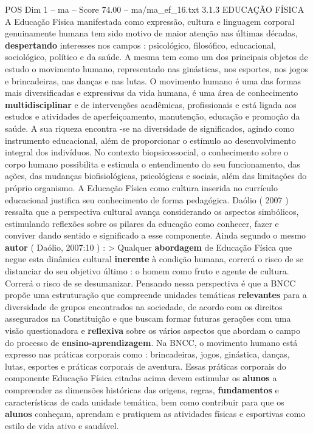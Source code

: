 \begin{textsample}{POS Dim 1 – ma – Score 74.00 – ma/ma\_ef\_16.txt}  \label{ex:f1_pos_063}
3.1.3 EDUCAÇÃO FÍSICA A Educação Física manifestada como expressão, cultura e linguagem corporal genuinamente humana tem sido motivo de maior atenção nas últimas décadas, \textbf{despertando} interesses nos campos : psicológico, filosófico, educacional, sociológico, político e da saúde.
A mesma tem como um dos principais objetos de estudo o movimento humano, representado nas ginásticas, nos esportes, nos jogos e brincadeiras, nas danças e nas lutas.
O movimento humano é uma das formas mais diversificadas e expressivas da vida humana, é uma área de conhecimento \textbf{multidisciplinar} e de intervenções acadêmicas, profissionais e está ligada aos estudos e atividades de aperfeiçoamento, manutenção, educação e promoção da saúde.
A sua riqueza encontra -se na diversidade de significados, agindo como instrumento educacional, além de proporcionar o estímulo ao desenvolvimento integral dos indivíduos.
No contexto biopsicossocial, o conhecimento sobre o corpo humano possibilita e estimula o entendimento do seu funcionamento, das ações, das mudanças biofisiológicas, psicológicas e sociais, além das limitações do próprio organismo.
A Educação Física como cultura inserida no currículo educacional justifica seu conhecimento de forma pedagógica.
Daólio ( 2007 ) ressalta que a perspectiva cultural avança considerando os aspectos simbólicos, estimulando reflexões sobre os pilares da educação como conhecer, fazer e conviver dando sentido e significado a esse componente.
Ainda segundo o mesmo \textbf{autor} ( Daólio, 2007:10 ) : > Qualquer \textbf{abordagem} de Educação Física que negue esta dinâmica cultural \textbf{inerente} à condição humana, correrá o risco de se distanciar do seu objetivo último : o homem como fruto e agente de cultura.
Correrá o risco de se desumanizar.
Pensando nessa perspectiva é que a BNCC propõe uma estruturação que compreende unidades temáticas \textbf{relevantes} para a diversidade de grupos encontrados na sociedade, de acordo com os direitos assegurados na Constituição e que buscam formar futuras gerações com uma visão questionadora e \textbf{reflexiva} sobre os vários aspectos que abordam o campo do processo de \textbf{ensino-aprendizagem}.
Na BNCC, o movimento humano está expresso nas práticas corporais como : brincadeiras, jogos, ginástica, danças, lutas, esportes e práticas corporais de aventura.
Essas práticas corporais do componente Educação Física citadas acima devem estimular os \textbf{alunos} a compreender as dimensões históricas das origens, regras, \textbf{fundamentos} e características de cada unidade temática, bem como contribuir para que os \textbf{alunos} conheçam, aprendam e pratiquem as atividades físicas e esportivas como estilo de vida ativo e saudável.

\end{textsample}
